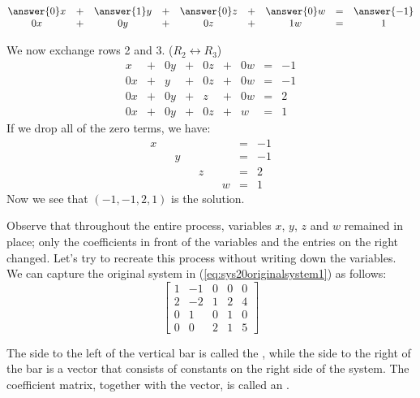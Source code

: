 \documentclass{ximera}
\begin{document}
\begin{exploration}
\begin{problem}
\begin{problem}
\begin{problem}
\begin{problem}
\begin{prompt}
$$\begin{matrix}
     \answer{0}x& +&\answer{1}y&+&\answer{0}z&+& \answer{0}w&=& \answer{-1}\\
     0x&+&0y&+&0z&+&1w&=&1
    \end{matrix}$$
\end{prompt}    
\end{problem}
\end{problem}
\end{problem}
\end{problem}
We now exchange rows 2 and 3. ($R_2\leftrightarrow R_3$)
\begin{equation}\label{eq:sys20rref1}
\begin{array}{ccccccccc}
      x &+ &0y&+&0z&+&0w&= &-1 \\
   0x& +&y&+&0z&+&0w&=&-1\\
   0x& +&0y&+&z&+&0w&=&2\\
     0x&+&0y&+&0z&+&w&=&1
    \end{array}
    \end{equation}
    If we drop all of the zero terms, we have:
    \begin{equation}\label{eq:sys20rrefnozeros}
    \begin{array}{ccccccccc}
      x & &&&&&&= &-1 \\
   & &y&&&&&=&-1\\
   & &&&z&&&=&2\\
     &&&&&&w&=&1
    \end{array}
    \end{equation}
Now we see that $(-1, -1, 2, 1)$ is the solution.


Observe that throughout the entire process, variables $x$, $y$, $z$ and $w$ remained in place; only the coefficients in front of the variables and the entries on the right changed.  Let's try to recreate this process without writing down the variables.  We can capture the original system in (\ref{eq:sys20originalsystem1}) as follows:
$$\left[\begin{array}{cccc|c}  
 1&-1&0&0&0\\2&-2&1&2&4\\0&1&0&1&0\\0&0&2&1&5
 \end{array}\right]$$
 
   The side to the left of the vertical bar is called the , while the side to the right of the bar is a vector that consists of constants on the right side of the system.  The coefficient matrix, together with the vector, is called an .
 

\end{exploration}
\end{document}
